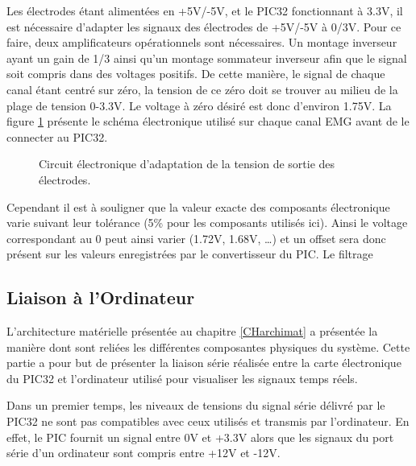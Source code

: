 \documentclass[letterpaper, twoside, 12pt, memoire, creativecommons, hyperref]{thETS}
\begin{document}
Les électrodes étant alimentées en +5V/-5V, et le PIC32 fonctionnant à 3.3V, il est nécessaire d’adapter les signaux des électrodes de +5V/-5V à 0/3V. Pour ce faire, deux amplificateurs opérationnels sont nécessaires. Un montage inverseur ayant un gain de 1/3 ainsi qu’un montage sommateur inverseur afin que le signal soit compris dans des voltages positifs. %
De cette manière, le signal de chaque canal étant centré sur zéro, la tension de ce zéro doit se trouver au milieu de la plage de tension 0-3.3V. Le voltage à zéro désiré est donc d’environ 1.75V.
La figure \ref{fig:adapttension} présente le schéma électronique utilisé sur chaque canal EMG avant de le connecter au PIC32.

\begin{figure}
	\centering
	\caption{Circuit électronique d'adaptation de la tension de sortie des électrodes.}
	\label{fig:adapttension}
\end{figure}

Cependant il est à souligner que la valeur exacte des composants électronique varie suivant leur tolérance (5\% pour les composants utilisés ici). Ainsi le voltage correspondant au 0 peut ainsi varier (1.72V, 1.68V, …) et un offset sera donc présent sur les valeurs enregistrées par le convertisseur du PIC. Le filtrage


\subsection{Liaison à l'Ordinateur}

L'architecture matérielle présentée au chapitre \ref{CHarchimat} a présentée la manière dont sont reliées les différentes composantes physiques du système. Cette partie a pour but de présenter la liaison série réalisée entre la carte électronique du PIC32 et l'ordinateur utilisé pour visualiser les signaux temps réels.

Dans un premier temps, les niveaux de tensions du signal série délivré par le PIC32 ne sont pas compatibles avec ceux utilisés et transmis par l'ordinateur. En effet, le PIC fournit un signal entre 0V et +3.3V alors que les signaux du port série d'un ordinateur sont compris entre +12V et -12V. 
\end{document}
